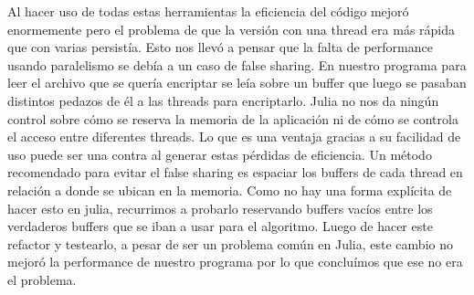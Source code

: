 \documentclass[11pt]{article}
\begin{document}
Al hacer uso de todas estas herramientas la eficiencia del código mejoró enormemente pero el problema de que la versión con una thread era más rápida que con varias persistía. Esto nos llevó a pensar que la falta de performance usando paralelismo se debía a un caso de false sharing. En nuestro programa para leer el archivo que se quería encriptar se leía sobre un buffer que luego se pasaban distintos pedazos de él a las threads para encriptarlo. Julia no nos da ningún control sobre cómo se reserva la memoria de la aplicación ni de cómo se controla el acceso entre diferentes threads. Lo que es una ventaja gracias a su facilidad de uso puede ser una contra al generar estas pérdidas de eficiencia. Un método recomendado para evitar el false sharing es espaciar los buffers de cada thread en relación a donde se ubican en la memoria. Como no hay una forma explícita de hacer esto en julia, recurrimos a probarlo reservando buffers vacíos entre los verdaderos buffers que se iban a usar para el algoritmo. Luego de hacer este refactor y testearlo, a pesar de ser un problema común en Julia, este cambio no mejoró la performance de nuestro programa por lo que concluímos que ese no era el problema.
\end{document}
